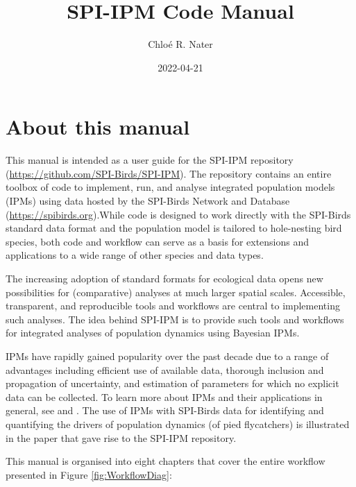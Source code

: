 \documentclass[
]{book}
\title{SPI-IPM Code Manual}
\author{Chloé R. Nater}
\date{2022-04-21}
\begin{document}
\maketitle

{
\setcounter{tocdepth}{1}
\tableofcontents
}
\hypertarget{about-this-manual}{%
\chapter*{About this manual}\label{about-this-manual}}

This manual is intended as a user guide for the SPI-IPM repository (\url{https://github.com/SPI-Birds/SPI-IPM}). The repository contains an entire toolbox of code to implement, run, and analyse integrated population models (IPMs) using data hosted by the SPI-Birds Network and Database (\url{https://spibirds.org}).While code is designed to work directly with the SPI-Birds standard data format and the population model is tailored to hole-nesting bird species, both code and workflow can serve as a basis for extensions and applications to a wide range of other species and data types.

The increasing adoption of standard formats for ecological data opens new possibilities for (comparative) analyses at much larger spatial scales. Accessible, transparent, and reproducible tools and workflows are central to implementing such analyses. The idea behind SPI-IPM is to provide such tools and workflows for integrated analyses of population dynamics using Bayesian IPMs.

IPMs have rapidly gained popularity over the past decade due to a range of advantages including efficient use of available data, thorough inclusion and propagation of uncertainty, and estimation of parameters for which no explicit data can be collected. To learn more about IPMs and their applications in general, see \citet{plard2019} and \citet{schaub2021}. The use of IPMs with SPI-Birds data for identifying and quantifying the drivers of population dynamics (of pied flycatchers) is illustrated in the paper that gave rise to the SPI-IPM repository.

This manual is organised into eight chapters that cover the entire workflow presented in Figure \ref{fig:WorkflowDiag}:
\end{document}
